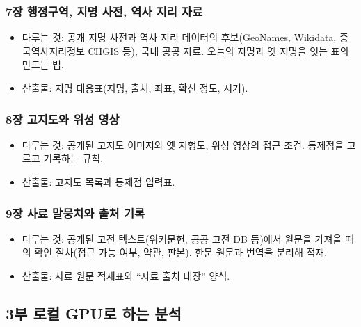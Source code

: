 \documentclass[10pt,a4paper]{article}
\providecommand{\tightlist}{\setlength{\itemsep}{0pt}\setlength{\parskip}{0pt}}
\begin{document}
\hypertarget{uxc7a5-uxd589uxc815uxad6cuxc5ed-uxc9c0uxba85-uxc0acuxc804-uxc5eduxc0ac-uxc9c0uxb9ac-uxc790uxb8cc}{%
\subsubsection{7장 행정구역, 지명 사전, 역사 지리 자료}\label{uxc7a5-uxd589uxc815uxad6cuxc5ed-uxc9c0uxba85-uxc0acuxc804-uxc5eduxc0ac-uxc9c0uxb9ac-uxc790uxb8cc}}

\begin{itemize}
\tightlist
\item
  다루는 것: 공개 지명 사전과 역사 지리 데이터의 후보(GeoNames, Wikidata, 중국역사지리정보 CHGIS 등), 국내 공공 자료. 오늘의 지명과 옛 지명을 잇는 표의 만드는 법.
\item
  산출물: 지명 대응표(지명, 출처, 좌표, 확신 정도, 시기).
\end{itemize}

\hypertarget{uxc7a5-uxace0uxc9c0uxb3c4uxc640-uxc704uxc131-uxc601uxc0c1}{%
\subsubsection{8장 고지도와 위성 영상}\label{uxc7a5-uxace0uxc9c0uxb3c4uxc640-uxc704uxc131-uxc601uxc0c1}}

\begin{itemize}
\tightlist
\item
  다루는 것: 공개된 고지도 이미지와 옛 지형도, 위성 영상의 접근 조건. 통제점을 고르고 기록하는 규칙.
\item
  산출물: 고지도 목록과 통제점 입력표.
\end{itemize}

\hypertarget{uxc7a5-uxc0acuxb8cc-uxb9d0uxbb49uxce58uxc640-uxcd9cuxcc98-uxae30uxb85d}{%
\subsubsection{9장 사료 말뭉치와 출처 기록}\label{uxc7a5-uxc0acuxb8cc-uxb9d0uxbb49uxce58uxc640-uxcd9cuxcc98-uxae30uxb85d}}

\begin{itemize}
\tightlist
\item
  다루는 것: 공개된 고전 텍스트(위키문헌, 공공 고전 DB 등)에서 원문을 가져올 때의 확인 절차(접근 가능 여부, 약관, 판본). 한문 원문과 번역을 분리해 적재.
\item
  산출물: 사료 원문 적재표와 ``자료 출처 대장'' 양식.
\end{itemize}

\hypertarget{uxbd80-uxb85cuxceec-gpuuxb85c-uxd558uxb294-uxbd84uxc11d}{%
\subsection{3부 로컬 GPU로 하는 분석}\label{uxbd80-uxb85cuxceec-gpuuxb85c-uxd558uxb294-uxbd84uxc11d}}
\end{document}
